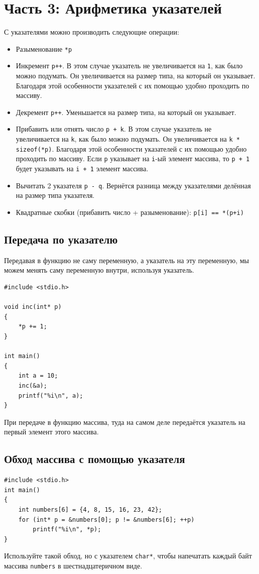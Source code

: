 \documentclass{article}
\begin{document}
\section*{Часть 3: Арифметика указателей}
С указателями можно производить следующие операции:
\begin{itemize}
\item Разыменование \texttt{*p}
\item Инкремент \texttt{p++}. В этом случае указатель не увеличивается на \texttt{1}, как было можно подумать. Он увеличивается на размер типа, на который он указывает. Благодаря этой особенности указателей с их помощью удобно проходить по массиву.
\item Декремент \texttt{p++}. Уменьшается на размер типа, на который он указывает.
\item Прибавить или отнять число \texttt{p + k}. В этом случае указатель не увеличивается на \texttt{k}, как было можно подумать. Он увеличивается на \texttt{k * sizeof(*p)}. Благодаря этой особенности указателей с их помощью удобно проходить по массиву. Если \texttt{p} указывает на \texttt{i}-ый элемент массива, то \texttt{p + 1} будет указывать на \texttt{i + 1} элемент массива.
\item Вычитать 2 указателя \texttt{p - q}. Вернётся разница между указателями делённая на размер типа указателя.
\item Квадратные скобки (прибавить число + разыменование): \quad \texttt{p[i] == *(p+i)}
\end{itemize}

\subsection*{Передача по указателю}
Передавая в функцию не саму переменную, а указатель на эту переменную, мы можем менять саму переменную внутри, используя указатель.
\begin{lstlisting}
#include <stdio.h>

void inc(int* p)
{
    *p += 1;
}

int main()
{
    int a = 10;
    inc(&a);
    printf("%i\n", a);
}
\end{lstlisting}

При передаче в функцию массива, туда на самом деле передаётся указатель на первый элемент этого массива.

\subsection*{Обход массива с помощью указателя}
\begin{lstlisting}
#include <stdio.h>
int main() 
{
    int numbers[6] = {4, 8, 15, 16, 23, 42};
    for (int* p = &numbers[0]; p != &numbers[6]; ++p) 
        printf("%i\n", *p);
}
\end{lstlisting}
Используйте такой обход, но с указателем \texttt{char*}, чтобы напечатать каждый байт массива \texttt{numbers} в шестнадцатеричном виде.
\end{document}
